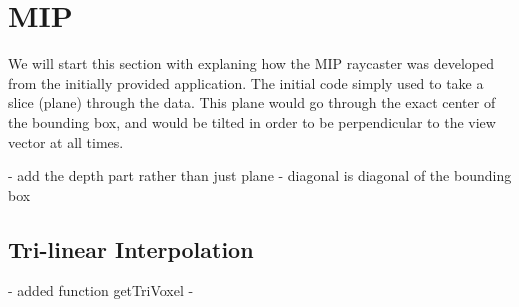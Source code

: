 
\section{MIP}\label{sec:mip}
We will start this section with explaning how the MIP raycaster was developed from the initially provided application. The initial code simply used to take a slice (plane) through the data. This plane would go through the exact center of the bounding box, and would be tilted in order to be perpendicular to the view vector at all times.


- add the depth part rather than just plane
- diagonal is diagonal of the bounding box

\subsection{Tri-linear Interpolation}\label{sec:tri_linear}
- added function getTriVoxel
- %

